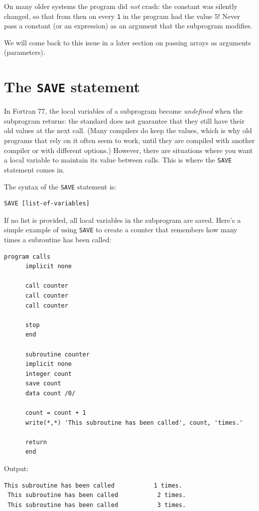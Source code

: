 On many older systems the program did \emph{not} crash: the constant was silently changed, so that from then on every \texttt{1} in the program had the value 5! Never pass a constant (or an expression) as an argument that the subprogram modifies.

We will come back to this issue in a later section on passing arrays as arguments (parameters).

\section{The \texttt{SAVE} statement}

In Fortran 77, the local variables of a subprogram become \emph{undefined} when the subprogram returns: the standard does not guarantee that they still have their old values at the next call. (Many compilers do keep the values, which is why old programs that rely on it often seem to work, until they are compiled with another compiler or with different options.) However, there are situations where you want a local variable to maintain its value between calls. This is where the \texttt{SAVE} statement comes in.

The syntax of the \texttt{SAVE} statement is:

\begin{lstlisting}[style=fortran77]
      SAVE [list-of-variables]
\end{lstlisting}

If no list is provided, all local variables in the subprogram are saved. Here's a simple example of using \texttt{SAVE} to create a counter that remembers how many times a subroutine has been called:

\begin{lstlisting}[style=fortran77]
      program calls
      implicit none

      call counter
      call counter
      call counter

      stop
      end

      subroutine counter
      implicit none
      integer count
      save count
      data count /0/

      count = count + 1
      write(*,*) 'This subroutine has been called', count, 'times.'

      return
      end
\end{lstlisting}

Output:

\begin{lstlisting}[style=output]
 This subroutine has been called           1 times.
 This subroutine has been called           2 times.
 This subroutine has been called           3 times.
\end{lstlisting}

